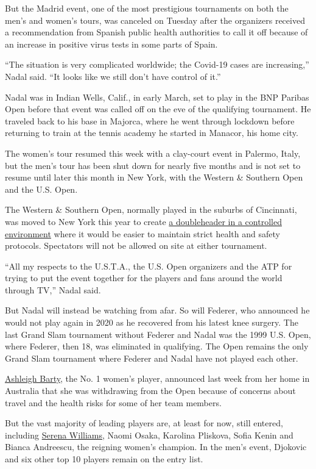 But the Madrid event, one of the most prestigious tournaments on both
the men's and women's tours, was canceled on Tuesday after the
organizers received a recommendation from Spanish public health
authorities to call it off because of an increase in positive virus
tests in some parts of Spain.

``The situation is very complicated worldwide; the Covid-19 cases are
increasing,'' Nadal said. ``It looks like we still don't have control of
it.''

Nadal was in Indian Wells, Calif., in early March, set to play in the
BNP Paribas Open before that event was called off on the eve of the
qualifying tournament. He traveled back to his base in Majorca, where he
went through lockdown before returning to train at the tennis academy he
started in Manacor, his home city.

The women's tour resumed this week with a clay-court event in Palermo,
Italy, but the men's tour has been shut down for nearly five months and
is not set to resume until later this month in New York, with the
Western \& Southern Open and the U.S. Open.

The Western \& Southern Open, normally played in the suburbs of
Cincinnati, was moved to New York this year to create
\href{https://www.nytimes.com/2020/08/03/sports/tennis/us-open-hawkeye-line-judges.html}{a
doubleheader in a controlled environment} where it would be easier to
maintain strict health and safety protocols. Spectators will not be
allowed on site at either tournament.

``All my respects to the U.S.T.A., the U.S. Open organizers and the ATP
for trying to put the event together for the players and fans around the
world through TV,'' Nadal said.

But Nadal will instead be watching from afar. So will Federer, who
announced he would not play again in 2020 as he recovered from his
latest knee surgery. The last Grand Slam tournament without Federer and
Nadal was the 1999 U.S. Open, where Federer, then 18, was eliminated in
qualifying. The Open remains the only Grand Slam tournament where
Federer and Nadal have not played each other.

\href{https://www.nytimes.com/2020/07/29/sports/tennis/ashleigh-barty-us-open.html}{Ashleigh
Barty}, the No. 1 women's player, announced last week from her home in
Australia that she was withdrawing from the Open because of concerns
about travel and the health risks for some of her team members.

But the vast majority of leading players are, at least for now, still
entered, including
\href{https://www.nytimes.com/2020/06/17/sports/tennis/serena-williams-us-open.html}{Serena
Williams}, Naomi Osaka, Karolina Pliskova, Sofia Kenin and Bianca
Andreescu, the reigning women's champion. In the men's event, Djokovic
and six other top 10 players remain on the entry list.

